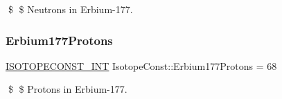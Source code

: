 \$ \$ Neutrons in Erbium-\/177. \mbox{\label{group___isotope_const-_erbium-_er177_ga8d369516cf9c354ab389934826c39a23}} 
\subsubsection{\texorpdfstring{Erbium177\+Protons}{Erbium177Protons}}
{\footnotesize\ttfamily \mbox{\hyperlink{group___isotope_const-_macros_ga5f18360b3e99483a35c32d789e62621c}{I\+S\+O\+T\+O\+P\+E\+C\+O\+N\+S\+T\+\_\+\+I\+NT}} Isotope\+Const\+::\+Erbium177\+Protons = 68}

\$ \$ Protons in Erbium-\/177. 